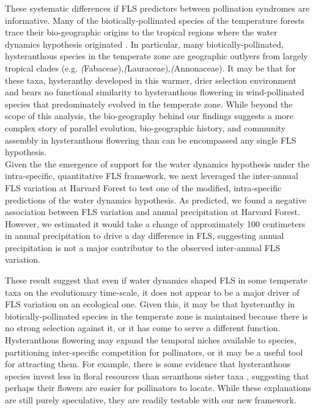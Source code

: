 \documentclass{article}
\begin{document}
These systematic differences if FLS predictors between pollination syndromes are informative. Many of the biotically-pollinated species of the temperature forests trace their bio-geographic origins to the tropical regions \citep{Daubenmire1972} where the water dynamics hypothesis originated \citep{Janzen1967,Franklin2016}. In particular, many biotically-pollinated, hysteranthous species in the temperate zone are geographic outlyers from largely tropical clades (e.g. \textit(Fabaceae),\textit(Lauraceae),\textit(Annonaceae). It may be that for these taxa, hysteranthy developed in this warmer, drier selection environment and bears no functional similarity to hysteranthous flowering in wind-pollinated species that predominately evolved in the temperate zone. While beyond the scope of this analysis, the bio-geography behind our findings suggests a more complex story of parallel evolution, bio-geographic history, and community assembly in hysteranthous flowering than can be encompassed any single FLS hypothesis.\\

\noindent Given the the emergence of support for the water dynamics hypothesis under the intra-specific, quantitative FLS framework, we next leveraged the inter-annual FLS variation at Harvard Forest to test one of the modified, intra-specific predictions of the water dynamics hypothesis. As predicted, we found a negative association between FLS variation and annual precipitation at Harvard Forest. However, we estimated it would take a change of approximately 100 centimeters in annual precipitation to drive a day difference in FLS, suggesting annual precipitation is not a major contributor to the observed inter-annual FLS variation.

These result suggest that even if water dynamics shaped FLS in some temperate taxa on the evolutionary time-scale, it does not appear to be a major driver of FLS variation on an ecological one. Given this, it may be that hysteranthy in biotically-pollinated species in the temperate zone is maintained because there is no strong selection against it, or it has come to serve a different function. Hysteranthous flowering may expand the temporal niches available to species, partitioning inter-specific competition for pollinators, or it may be a useful tool for attracting them. For example, there is some evidence that hysteranthous species invest less in floral resources than seranthous sister taxa \citep{Gunatilleke1984}, suggesting that perhaps their flowers are easier for pollinators to locate. While these explanations are still purely speculative, they are readily testable with our new framework.\\
\end{document}
